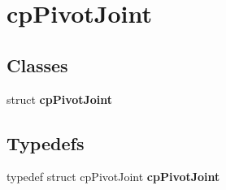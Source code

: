 \hypertarget{group__cp_pivot_joint}{\section{cp\-Pivot\-Joint}
\label{group__cp_pivot_joint}
}
\subsection*{Classes}
\begin{DoxyCompactItemize}
\item 
struct {\bfseries cp\-Pivot\-Joint}
\end{DoxyCompactItemize}
\subsection*{Typedefs}
\begin{DoxyCompactItemize}
\item 
\hypertarget{group__cp_pivot_joint_ga3c31cf827a72077a73af96e53976b20b}{typedef struct cp\-Pivot\-Joint {\bfseries cp\-Pivot\-Joint}}\label{group__cp_pivot_joint_ga3c31cf827a72077a73af96e53976b20b}

\end{DoxyCompactItemize}
